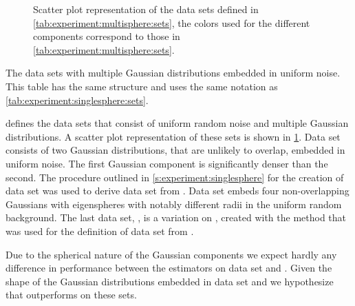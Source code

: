 
\begin{figure}
	\centering
	
	\caption{Scatter plot representation of the data sets defined in \cref{tab:experiment:multisphere:sets}, the colors used for the different components correspond to those in \cref{tab:experiment:multisphere:sets}.}
	\label{fig:experiment:multisphere:sets}
\end{figure}

\begin{table*}
	\centering
	
	\caption{The data sets with multiple Gaussian distributions embedded in uniform noise. This table has the same structure and uses the same notation as \cref{tab:experiment:singlesphere:sets}.} 	
	\label{tab:experiment:multisphere:sets}
\end{table*}

 defines the data sets that consist of uniform random noise and multiple Gaussian distributions. A scatter plot representation of these sets is shown in \cref{fig:experiment:multisphere:sets}. 
	Data set \ferdosiTwo consists of two Gaussian distributions, that are unlikely to overlap, embedded in uniform noise. The first Gaussian component is significantly denser than the second. 
	The procedure outlined in \cref{s:experiment:singlesphere} for the creation of data set \baakmanOne was used to derive data set \baakmanTwo from \ferdosiTwo.
	Data set \ferdosiThree embeds four non-overlapping Gaussians with eigenspheres with notably different radii in the uniform random background. 
	The last data set, \baakmanThree, is a variation on \ferdosiThree, created with the method that was used for the definition of data set \baakmanOne from \ferdosiOne. 

	Due to the spherical nature of the Gaussian components we expect hardly any difference in performance between the estimators on data set \ferdosiTwo and \ferdosiThree. Given the shape of the Gaussian distributions embedded in data set \baakmanTwo and \baakmanThree we hypothesize that \sambe outperforms \mbe on these sets.